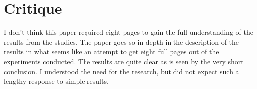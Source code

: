 \documentclass{article}
\begin{document}
\section*{Critique}
I don't think this paper required eight pages to gain the full understanding of the results from the studies. The paper goes so in depth in the description of the results in what seems like an attempt to get eight full pages out of the experiments conducted. The results are quite clear as is seen by the very short conclusion. I understood the need for the research, but did not expect such a lengthy response to simple results.
\cite{6249621}
\end{document}

